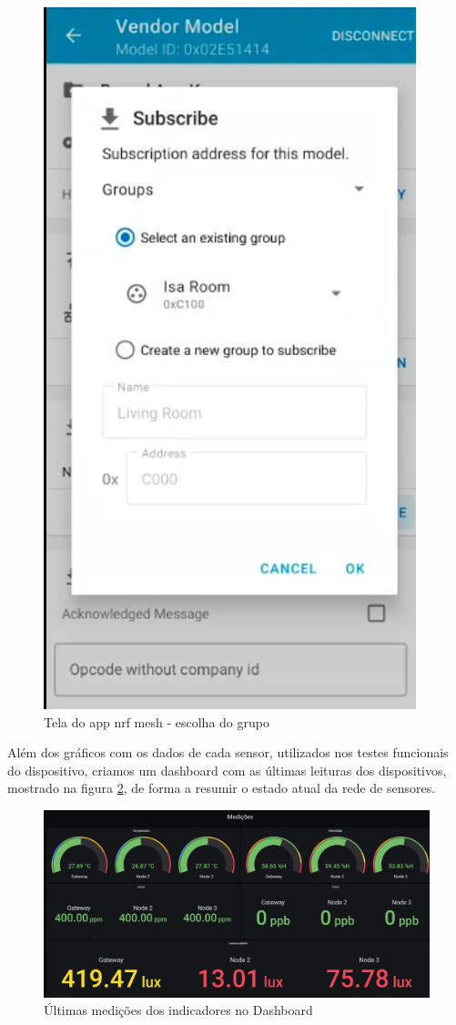 \documentclass[../monografia.tex]{subfiles}
\begin{document}
\begin{figure}[h]
	\centering
	\includegraphics[scale=0.5]{mesh-subscribe.JPG}
	\caption{Tela do app nrf mesh - escolha do grupo}
	\label{mesh-subscribe}
\end{figure}

Além dos gráficos com os dados de cada sensor, utilizados nos testes funcionais do dispositivo, criamos um dashboard com as últimas leituras dos dispositivos, mostrado na figura \ref{fig:dashboard-medicoes}, de forma a resumir o estado atual da rede de sensores. 

\begin{figure}[h]
	\centering
	\includegraphics[width=\textwidth]{dashboard-medicoes}
	\caption{Últimas medições dos indicadores no Dashboard}
	\label{fig:dashboard-medicoes}
\end{figure}
\end{document}
